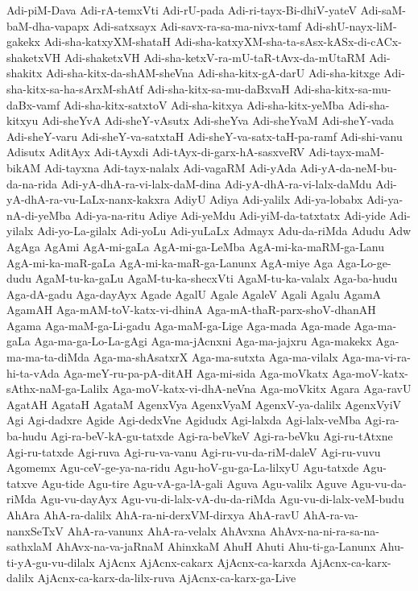 {Adi-piM-Dava
Adi-rA-temxVti
Adi-rU-pada
Adi-ri-tayx-Bi-dhiV-yateV
Adi-saM-baM-dha-vapapx
Adi-satxsayx
Adi-savx-ra-sa-ma-nivx-tamf
Adi-shU-nayx-liM-gakekx
Adi-sha-katxyXM-shataH
Adi-sha-katxyXM-sha-ta-sAsx-kASx-di-cACx-shaketxVH
Adi-shaketxVH
Adi-sha-ketxV-ra-mU-taR-tAvx-da-mUtaRM
Adi-shakitx
Adi-sha-kitx-da-shAM-sheVna
Adi-sha-kitx-gA-darU
Adi-sha-kitxge
Adi-sha-kitx-sa-ha-sArxM-shAtf
Adi-sha-kitx-sa-mu-daBxvaH
Adi-sha-kitx-sa-mu-daBx-vamf
Adi-sha-kitx-satxtoV
Adi-sha-kitxya
Adi-sha-kitx-yeMba
Adi-sha-kitxyu
Adi-sheYvA
Adi-sheY-vAsutx
Adi-sheYva
Adi-sheYvaM
Adi-sheY-vada
Adi-sheY-varu
Adi-sheY-va-satxtaH
Adi-sheY-va-satx-taH-pa-ramf
Adi-shi-vanu
Adisutx
AditAyx
Adi-tAyxdi
Adi-tAyx-di-garx-hA-sasxveRV
Adi-tayx-maM-bikAM
Adi-tayxna
Adi-tayx-nalalx
Adi-vagaRM
Adi-yAda
Adi-yA-da-neM-bu-da-na-rida
Adi-yA-dhA-ra-vi-lalx-daM-dina
Adi-yA-dhA-ra-vi-lalx-daMdu
Adi-yA-dhA-ra-vu-LaLx-nanx-kakxra
AdiyU
Adiya
Adi-yalilx
Adi-ya-lobabx
Adi-ya-nA-di-yeMba
Adi-ya-na-ritu
Adiye
Adi-yeMdu
Adi-yiM-da-tatxtatx
Adi-yide
Adi-yilalx
Adi-yo-La-gilalx
Adi-yoLu
Adi-yuLaLx
Admayx
Adu-da-riMda
Adudu
Adw
AgAga
AgAmi
AgA-mi-gaLa
AgA-mi-ga-LeMba
AgA-mi-ka-maRM-ga-Lanu
AgA-mi-ka-maR-gaLa
AgA-mi-ka-maR-ga-Lanunx
AgA-miye
Aga
Aga-Lo-ge-dudu
AgaM-tu-ka-gaLu
AgaM-tu-ka-shecxVti
AgaM-tu-ka-valalx
Aga-ba-hudu
Aga-dA-gadu
Aga-dayAyx
Agade
AgalU
Agale
AgaleV
Agali
Agalu
AgamA
AgamAH
Aga-mAM-toV-katx-vi-dhinA
Aga-mA-thaR-parx-shoV-dhanAH
Agama
Aga-maM-ga-Li-gadu
Aga-maM-ga-Lige
Aga-mada
Aga-made
Aga-ma-gaLa
Aga-ma-ga-Lo-La-gAgi
Aga-ma-jAcnxni
Aga-ma-jajxru
Aga-makekx
Aga-ma-ma-ta-diMda
Aga-ma-shAsatxrX
Aga-ma-sutxta
Aga-ma-vilalx
Aga-ma-vi-ra-hi-ta-vAda
Aga-meY-ru-pa-pA-ditAH
Aga-mi-sida
Aga-moVkatx
Aga-moV-katx-sAthx-naM-ga-Lalilx
Aga-moV-katx-vi-dhA-neVna
Aga-moVkitx
Agara
Aga-ravU
AgatAH
AgataH
AgataM
AgenxVya
AgenxVyaM
AgenxV-ya-dalilx
AgenxVyiV
Agi
Agi-dadxre
Agide
Agi-dedxVne
Agidudx
Agi-lalxda
Agi-lalx-veMba
Agi-ra-ba-hudu
Agi-ra-beV-kA-gu-tatxde
Agi-ra-beVkeV
Agi-ra-beVku
Agi-ru-tAtxne
Agi-ru-tatxde
Agi-ruva
Agi-ru-va-vanu
Agi-ru-vu-da-riM-daleV
Agi-ru-vuvu
Agomemx
Agu-ceV-ge-ya-na-ridu
Agu-hoV-gu-ga-La-lilxyU
Agu-tatxde
Agu-tatxve
Agu-tide
Agu-tire
Agu-vA-ga-lA-gali
Aguva
Agu-valilx
Aguve
Agu-vu-da-riMda
Agu-vu-dayAyx
Agu-vu-di-lalx-vA-du-da-riMda
Agu-vu-di-lalx-veM-budu
AhAra
AhA-ra-dalilx
AhA-ra-ni-derxVM-dirxya
AhA-ravU
AhA-ra-va-nanxSeTxV
AhA-ra-vanunx
AhA-ra-velalx
AhAvxna
AhAvx-na-ni-ra-sa-na-sathxlaM
AhAvx-na-va-jaRnaM
AhinxkaM
AhuH
Ahuti
Ahu-ti-ga-Lanunx
Ahu-ti-yA-gu-vu-dilalx
AjAcnx
AjAcnx-cakarx
AjAcnx-ca-karxda
AjAcnx-ca-karx-dalilx
AjAcnx-ca-karx-da-lilx-ruva
AjAcnx-ca-karx-ga-Live
}
